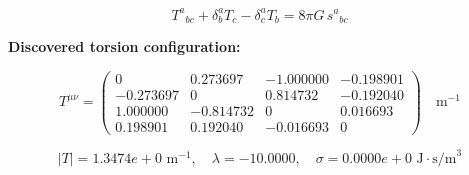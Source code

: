 
\begin{equation}
  T^a{}_{bc} + \delta^a_b T_c - \delta^a_c T_b = 8\pi G \, s^a{}_{bc}
\end{equation}

\textbf{Discovered torsion configuration:}

\begin{equation}
  T^{\mu\nu} = \begin{pmatrix}
    0 & 0.273697 & -1.000000 & -0.198901 \\
    -0.273697 & 0 & 0.814732 & -0.192040 \\
    1.000000 & -0.814732 & 0 & 0.016693 \\
    0.198901 & 0.192040 & -0.016693 & 0
  \end{pmatrix} \quad \text{m}^{-1}
\end{equation}

\begin{equation}
  |T| = 1.3474e+0 \text{ m}^{-1}, \quad
  \lambda = -10.0000, \quad
  \sigma = 0.0000e+0 \text{ J}\cdot\text{s/m}^3
\end{equation}